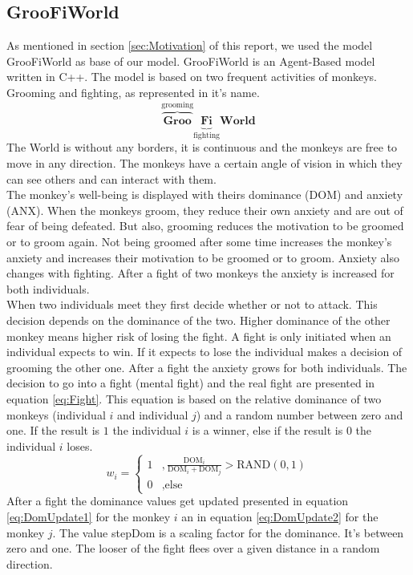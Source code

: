 \documentclass[11pt]{article}
\begin{document}
\subsection{GrooFiWorld}
As mentioned in section \ref{sec:Motivation} of this report, we used the model GrooFiWorld as base of our model. GrooFiWorld is an Agent-Based model written in C++\cite{Puga-Gonzalez2009}. The model is based on two frequent activities of monkeys. Grooming and fighting, as represented in it's name.\\
\[ \overbrace{\textbf{Groo}}^\text{grooming}\underbrace{\textbf{Fi}}_\text{fighting}\textbf{World} \]
The World is without any borders, it is continuous and the monkeys are free to move in any direction. The monkeys have a certain angle of vision in which they can see others and can interact with them.\\
The monkey's well-being  is displayed with theirs  dominance (DOM) and anxiety (ANX). When the monkeys groom, they reduce their own anxiety and are out of fear of being defeated. But also, grooming reduces the motivation to be groomed or to groom again. Not being groomed after some time increases the monkey's anxiety and increases their motivation to be groomed or to groom. Anxiety also changes with fighting. After a fight of two monkeys the anxiety is increased for both individuals.\\
When two individuals meet they first decide whether or not to attack. This decision depends on the dominance of the two. Higher dominance of the other monkey means higher risk of losing the fight. A fight is only initiated when an individual expects to win. If it expects to lose the individual makes a decision of grooming the other one. After a fight the anxiety grows for both individuals. The decision to go into a fight (mental fight) and the real fight are presented in equation \ref{eq:Fight}. This equation is based on the relative dominance of two monkeys (individual $i$ and individual $j$) and a random number between zero and one. If the result is $1$ the individual $i$ is a winner, else if the result is $0$ the individual $i$ loses.
\begin{equation}
\label{eq:Fight}
w_i=\left\lbrace\begin{array}{cc}
1 & ,\frac{\text{DOM}_i}{\text{DOM}_i+\text{DOM}_j}>\text{RAND}(0,1)\\
0 & ,\text{else}
\end{array}\right.
\end{equation}
After a fight the dominance values get updated presented in equation \ref{eq:DomUpdate1} for the monkey $i$ an in equation \ref{eq:DomUpdate2} for the monkey $j$. The value stepDom is a scaling factor for the dominance. It's between zero and one. The looser of the fight flees over a given distance in a random direction.
\end{document}
